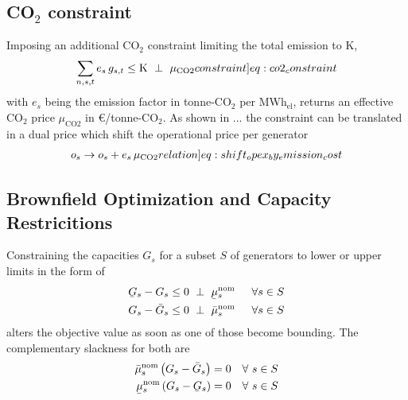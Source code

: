 \documentclass[11pt,twocolumn]{article}
\newcommand{\ubar}[1]{\underaccent{\bar}{#1}}
\newcommand{\hpad}{\hspace{15pt}}
\newcommand{\resultsin}[1]{\hspace{6pt} \bot  \hspace{6pt} #1}
\newcommand{\Forall}[1]{\hspace{10pt} \forall \,\, #1 }
\newcommand{\generation}{g_{s,t}}
\newcommand{\capacitygeneration}{G_{s}}
\newcommand{\capacitygenerationupper}{\bar{G}_{s}}
\newcommand{\capacitygenerationlower}{\ubar{G}_{s}}
\newcommand{\operationalpricegeneration}{o_{s}}
\newcommand{\capitalpricegeneration}{c_{s}}
\newcommand{\muuppergenerationnom}{\bar{\mu}^\text{nom}_{s}}
\newcommand{\mulowergenerationnom}{\ubar{\mu}^\text{nom}_{s}}
\newcommand{\lmp}[1][n]{\lambda_{#1,t}}
\newcommand{\emission}{e_{s}}
\newcommand{\emissionprice}{\mu_{\text{CO2}}}
\newcommand{\megawatthour}{MWh$_\text{el}$}
\begin{document}
\subsection{CO$_2$ constraint}

Imposing an additional CO$_2$ constraint limiting the total emission to K,  
\begin{align}
\sum_{n,s,t} \emission \, \generation \le \text{K} \resultsin{\emissionprice} 
\label[constraint]{eq:co2_constraint}
\end{align}
with $\emission$ being the emission factor in tonne-CO$_2$ per \megawatthour, returns an effective CO$_2$ price $\emissionprice$ in \euro/tonne-CO$_2$. 
% 
As shown in ... the constraint can be translated in a dual price which shift the operational price per generator
\begin{align}
\operationalpricegeneration \rightarrow \operationalpricegeneration + \emission \, \emissionprice \label[relation]{eq:shift_opex_by_emission_cost}
\end{align}



\subsection{Brownfield Optimization and Capacity Restricitions}

Constraining the capacities $\capacitygeneration$  for a subset $S$ of generators to lower or upper limits in the form of
\begin{align}
    \capacitygenerationlower - \capacitygeneration \le 0 \resultsin{\mulowergenerationnom} \hpad \forall{s \in S} \label{eq:capacityexpansionminimum}\\
    \capacitygeneration - \capacitygenerationupper \le 0 \resultsin{\muuppergenerationnom} \hpad \forall{s \in S}
\label{eq:capacityexpansionmaximum}
\end{align}
alters the objective value as soon as one of those become bounding. 
The complementary slackness for both are 
\begin{align}
    \muuppergenerationnom \left( \capacitygeneration - \capacitygenerationupper \right) =0 \Forall{s \in S} \\
    \mulowergenerationnom \left( \capacitygeneration - \capacitygenerationlower \right) =0 \Forall{s \in S}
\end{align}
\end{document}
